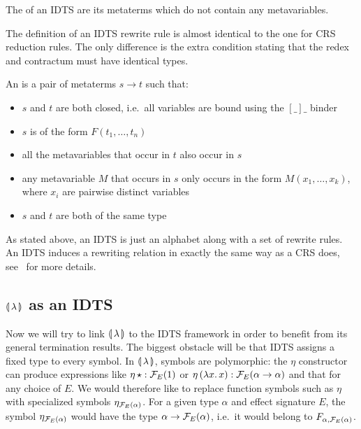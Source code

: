 \begin{definition}
  The  of an IDTS are its metaterms which do not contain any
  metavariables.
\end{definition}

The definition of an IDTS rewrite rule is almost identical to the one for
CRS reduction rules. The only difference is the extra condition stating
that the redex and contractum must have identical types.

\begin{definition}
  An  is a pair of metaterms $s \to t$ such that:
  \begin{itemize}
  \item $s$ and $t$ are both closed, i.e.\ all variables are bound using
    the $[\_]\_$ binder
  \item $s$ is of the form $F(t_1,\ldots,t_n)$
  \item all the metavariables that occur in $t$ also occur in $s$
  \item any metavariable $M$ that occurs in $s$ only occurs in the form
    $M(x_1,\ldots,x_k)$, where $x_i$ are pairwise distinct variables
  \item $s$ and $t$ are both of the same type
  \end{itemize}
\end{definition}

As stated above, an IDTS is just an alphabet along with a set of rewrite
rules. An IDTS induces a rewriting relation in exactly the same way as a
CRS does, see~\cite{blanqui2000termination} for more details.


\subsection{\texorpdfstring{$\llparenthesis \, \lambda \, \rrparenthesis$}{Our Calculus} as an IDTS}
\label{ssec:banana-idts}

Now we will try to link $\llparenthesis \, \lambda \, \rrparenthesis$ to the IDTS framework in order
to benefit from its general termination results. The biggest obstacle will
be that IDTS assigns a fixed type to every symbol. In $\llparenthesis \, \lambda \, \rrparenthesis$,
symbols are polymorphic: the $\eta$ constructor can produce expressions
like $\eta\,\star : \mathcal{F}_E(1)$ or
$\eta\,(\lambda x.\, x) : \mathcal{F}_E(\alpha \to \alpha)$ and that for any choice of
$E$. We would therefore like to replace function symbols such as $\eta$
with specialized symbols $\eta_{\mathcal{F}_E(\alpha)}$. For a given type $\alpha$
and effect signature $E$, the symbol $\eta_{\mathcal{F}_E(\alpha)}$ would have the
type $\alpha \to \mathcal{F}_E(\alpha)$, i.e.\ it would belong to
$F_{\alpha,\mathcal{F}_E(\alpha)}$.

